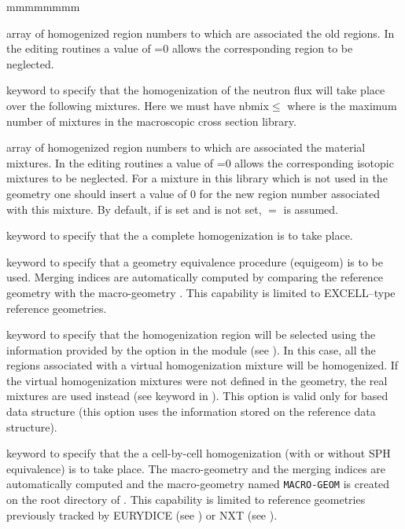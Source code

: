 \begin{ListeDeDescription}{mmmmmmmm}
\item[\dusa{iregm}] array of homogenized region numbers to which are
associated the old regions. In the editing routines a value of =0
allows the corresponding region to be neglected. 

\item[\moc{MIX}] keyword to specify that the homogenization of the neutron
flux will take place over the following mixtures. Here
we must have nbmix$\le$ where  is the maximum number
of mixtures in the macroscopic cross section library.  

\item[\dusa{imixm}] array of homogenized region numbers to which are
associated the material mixtures. In the editing routines a value of
=0 allows the corresponding isotopic mixtures to be neglected. For a mixture in this
library which is not used in the geometry one should insert a value of 0 for the
new region number associated with this mixture. By default, if  is set and
 is not set, $=$ is assumed.

\item[\moc{COMP}] keyword to specify that the a complete homogenization is to
take place. 

\item[\moc{GEO}] keyword to specify that a geometry equivalence procedure (equigeom) is to be used. Merging indices
are automatically computed by comparing the reference geometry  with the macro-geometry .
This capability is limited to EXCELL--type reference geometries.

\item[\moc{HMIX}] keyword to specify that the homogenization region will be selected using the information provided by the  option in the  module (see ). In this case, all the regions associated with a virtual homogenization mixture will be homogenized. If the virtual homogenization mixtures were not defined in the geometry, the real mixtures are used instead (see  keyword in ). This option is valid only for  based  data structure (this option uses the information stored on the reference  data structure).

\item[\moc{CELL}] keyword to specify that the a cell-by-cell homogenization
(with or without SPH equivalence) is to take place. The macro-geometry and the merging indices are automatically
computed and the macro-geometry named {\tt MACRO-GEOM} is created on the root directory of . This
capability is limited to reference geometries previously tracked by EURYDICE (see ) or NXT (see 
).


\end{ListeDeDescription}
